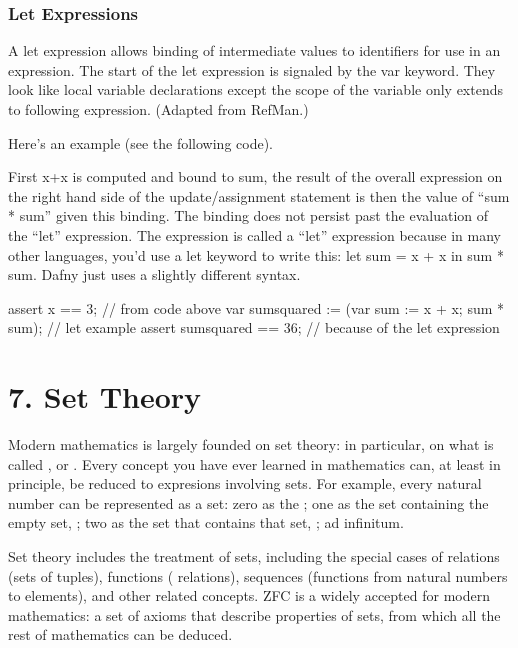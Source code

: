 \documentclass[letterpaper,10pt,english]{sphinxmanual}
\begin{document}
\subsection{Let Expressions}
\label{\detokenize{06-dafny-language:let-expressions}}
A let expression allows binding of intermediate values to identifiers
for use in an expression. The start of the let expression is signaled
by the var keyword. They look like local variable declarations except
the scope of the variable only extends to following
expression. (Adapted from RefMan.)

Here’s an example (see the following code).

First x+x is computed and bound to sum, the result of the overall
expression on the right hand side of the update/assignment statement
is then the value of “sum * sum” given this binding. The binding does
not persist past the evaluation of the “let” expression.  The
expression is called a “let” expression because in many other
languages, you’d use a let keyword to write this: let sum = x + x in
sum * sum. Dafny just uses a slightly different syntax.

\begin{sphinxVerbatim}[commandchars=\\\{\}]
assert x == 3;               // from code above
var sumsquared := (var sum := x + x; sum * sum);  // let example
assert sumsquared == 36;     // because of the let expression
\end{sphinxVerbatim}


\chapter{7. Set Theory}
\label{\detokenize{07-set-theory:set-theory}}\label{\detokenize{07-set-theory::doc}}
Modern mathematics is largely founded on set theory: in particular, on
what is called ,
or . Every concept you have ever learned in mathematics can, at
least in principle, be reduced to expresions involving sets.  For
example, every natural number can be represented as a set: zero as the
; one as the set containing the empty set, \sphinxstyleemphasis{\{\{\}\}}; two
as the set that contains that set, \sphinxstyleemphasis{\{\{\{\}\}\}}; ad infinitum.

Set theory includes the treatment of sets, including the special cases
of relations (sets of tuples), functions ( relations),
sequences (functions from natural numbers to elements), and other
related concepts.  ZFC is a widely accepted  for
modern mathematics: a set of axioms that describe properties of sets,
from which all the rest of mathematics can be deduced.
\end{document}
